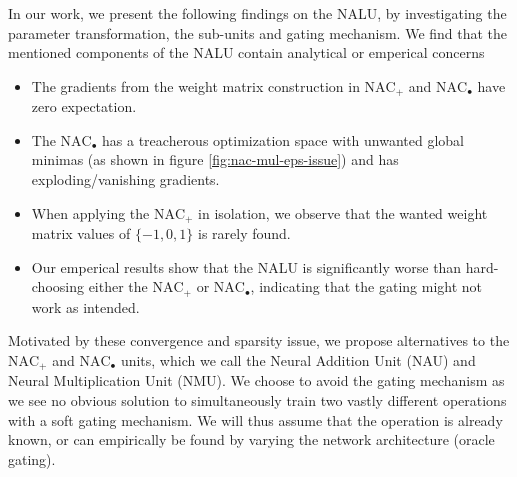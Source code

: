 In our work, we present the following findings on the NALU, by investigating the parameter transformation, the sub-units and gating mechanism.
We find that the mentioned components of the NALU contain analytical or emperical concerns
\begin{itemize}[leftmargin=0.5cm,itemsep=0pt,topsep=0pt]
\item The gradients from the weight matrix construction in $\text{NAC}_{+}$ and $\text{NAC}_{\bullet}$ have zero expectation.

\item The $\text{NAC}_{\bullet}$ has a treacherous optimization space with unwanted global minimas (as shown in figure \ref{fig:nac-mul-eps-issue}) and has exploding/vanishing gradients.

\item When applying the $\text{NAC}_{+}$ in isolation, we observe that the wanted weight matrix values of $\{-1, 0, 1\}$ is rarely found.

\item Our emperical results show that the NALU is significantly worse than hard-choosing either the $\text{NAC}_{+}$ or $\text{NAC}_{\bullet}$, indicating that the gating might not work as intended.
\end{itemize}
Motivated by these convergence and sparsity issue, we propose alternatives to the $\text{NAC}_{+}$ and $\text{NAC}_{\bullet}$ units, which we call the Neural Addition Unit (NAU) and Neural Multiplication Unit (NMU).
We choose to avoid the gating mechanism as we see no obvious solution to simultaneously train two vastly different operations with a soft gating mechanism.
We will thus assume that the operation is already known, or can empirically be found by varying the network architecture (oracle gating).


